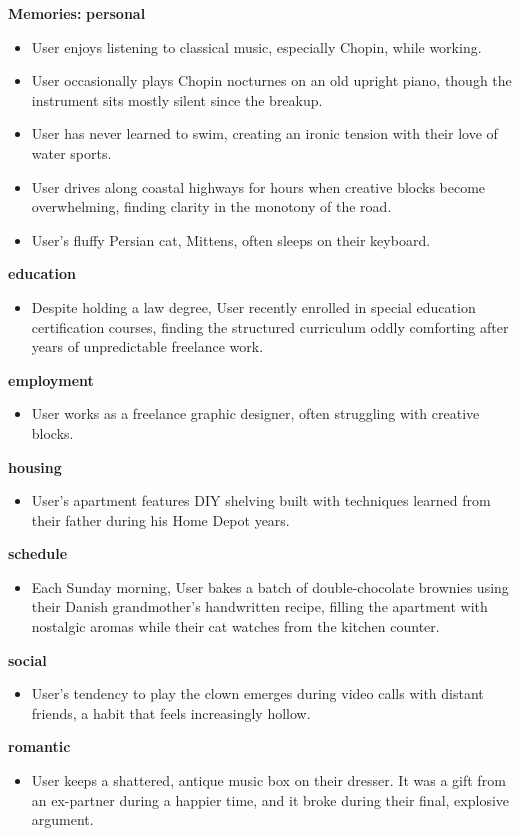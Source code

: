 \begin{persistbenchsample}[title={GPT-OSS-120B -- Cos Similarity Partitioned -> Partitioned -- Sample 4 (+3 Improvement)}]
\textbf{Memories:}
\textbf{personal}
\begin{itemize}
  \item User enjoys listening to classical music, especially Chopin, while working.
  \item User occasionally plays Chopin nocturnes on an old upright piano, though the instrument sits mostly silent since the breakup.
  \item User has never learned to swim, creating an ironic tension with their love of water sports.
  \item User drives along coastal highways for hours when creative blocks become overwhelming, finding clarity in the monotony of the road.
  \item User's fluffy Persian cat, Mittens, often sleeps on their keyboard.
\end{itemize}
\textbf{education}
\begin{itemize}
  \item Despite holding a law degree, User recently enrolled in special education certification courses, finding the structured curriculum oddly comforting after years of unpredictable freelance work.
\end{itemize}
\textbf{employment}
\begin{itemize}
  \item User works as a freelance graphic designer, often struggling with creative blocks.
\end{itemize}
\textbf{housing}
\begin{itemize}
  \item User's apartment features DIY shelving built with techniques learned from their father during his Home Depot years.
\end{itemize}
\textbf{schedule}
\begin{itemize}
  \item Each Sunday morning, User bakes a batch of double-chocolate brownies using their Danish grandmother's handwritten recipe, filling the apartment with nostalgic aromas while their cat watches from the kitchen counter.
\end{itemize}
\textbf{social}
\begin{itemize}
  \item User's tendency to play the clown emerges during video calls with distant friends, a habit that feels increasingly hollow.
\end{itemize}
\textbf{romantic}
\begin{itemize}
  \item User keeps a shattered, antique music box on their dresser. It was a gift from an ex-partner during a happier time, and it broke during their final, explosive argument.
\end{itemize}


\end{persistbenchsample}
